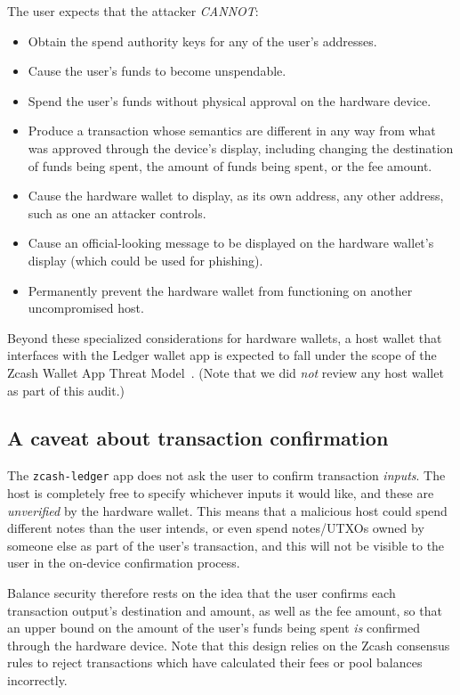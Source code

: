 \documentclass[10pt,titlepage]{article}
\begin{document}
The user expects that the attacker \emph{CANNOT}:

\begin{itemize}
    \item Obtain the spend authority keys for any of the user's addresses.
    \item Cause the user's funds to become unspendable.
    \item Spend the user's funds without physical approval on the hardware device.
    \item Produce a transaction whose semantics are different in any way from
    what was approved through the device's display, including changing the
    destination of funds being spent, the amount of funds being spent, or the
    fee amount.
    \item Cause the hardware wallet to display, as its own address, any other address, such as one an attacker controls.
    \item Cause an official-looking message to be displayed on the hardware wallet's display (which could be used for phishing).
    \item Permanently prevent the hardware wallet from functioning on another uncompromised host.
\end{itemize}

Beyond these specialized considerations for hardware wallets, a host wallet that
interfaces with the Ledger wallet app is expected to fall under the scope of the
Zcash Wallet App Threat Model~\cite{threatmodel}. (Note that we did \emph{not}
review any host wallet as part of this audit.)

\subsection{A caveat about transaction confirmation}

The \texttt{zcash-ledger} app does not ask the user to confirm transaction
\emph{inputs}. The host is completely free to specify whichever inputs it would
like, and these are \emph{unverified} by the hardware wallet. This means that a
malicious host could spend different notes than the user intends, or even spend
notes/UTXOs owned by someone else as part of the user's transaction, and this
will not be visible to the user in the on-device confirmation process. 

Balance security therefore rests on the idea that the user confirms each
transaction output's destination and amount, as well as the fee amount, so that an
upper bound on the amount of the user's funds being spent \emph{is} confirmed
through the hardware device. Note that this design relies on the Zcash
consensus rules to reject transactions which have calculated their fees
or pool balances incorrectly. 
\end{document}

